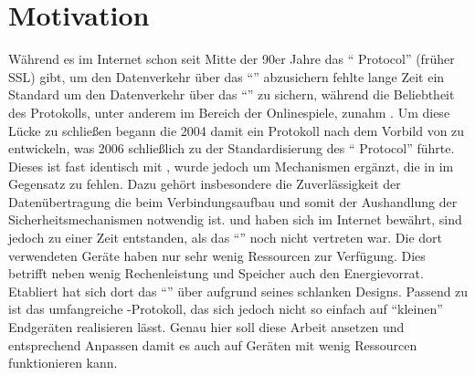 \section{Motivation}
Während es im Internet schon seit Mitte der 90er Jahre das  "` Protocol"' \cite{rfc5246} (früher SSL) gibt, um den Datenverkehr
über das "`"' abzusichern fehlte lange Zeit ein Standard um den Datenverkehr über das "`"' zu sichern, während die
Beliebtheit des Protokolls, unter anderem im Bereich der Onlinespiele, zunahm \cite[Kapitel 1]{rfc6347}. Um diese Lücke zu schließen begann
die  2004 damit ein Protokoll nach dem Vorbild von  zu entwickeln, was 2006 schließlich zu der Standardisierung des
"` Protocol"' \cite{rfc6347} führte. Dieses ist fast identisch mit , wurde jedoch um Mechanismen ergänzt, die in 
im Gegensatz zu  fehlen. Dazu gehört insbesondere die Zuverlässigkeit der Datenübertragung die beim Verbindungsaufbau und somit der
Aushandlung der Sicherheitsmechanismen notwendig ist.  und  haben sich im Internet bewährt, sind jedoch zu einer Zeit
entstanden, als das "`"' noch nicht vertreten war. Die dort verwendeten Geräte haben nur sehr wenig Ressourcen zur Verfügung.
Dies betrifft neben wenig Rechenleistung und Speicher auch den Energievorrat. Etabliert hat sich dort das "`"' \cite{draftcoap13}
über  aufgrund seines schlanken Designs. Passend zu  ist das umfangreiche -Protokoll, das sich jedoch nicht so
einfach auf "`kleinen"' Endgeräten realisieren lässt. Genau hier soll diese Arbeit ansetzen und  entsprechend Anpassen damit es
auch auf Geräten mit wenig Ressourcen funktionieren kann.
